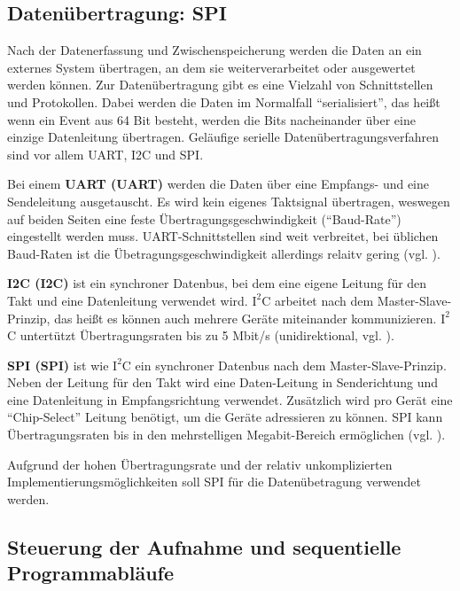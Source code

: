 \subsection{Datenübertragung: SPI}

Nach der Datenerfassung und Zwischenspeicherung werden die Daten an ein externes System übertragen, an dem sie weiterverarbeitet oder ausgewertet werden können. Zur Datenübertragung gibt es eine Vielzahl von Schnittstellen und Protokollen. Dabei werden die Daten im Normalfall ``serialisiert'', das heißt wenn ein Event aus 64 Bit besteht, werden die Bits nacheinander über eine einzige Datenleitung übertragen. Geläufige serielle Datenübertragungsverfahren sind vor allem \acrshort{UART}, \acrshort{I2C} und \acrshort{SPI}.
\begin{description}
	\item Bei einem \textbf{UART (\acrlong{UART})} werden die Daten über eine Empfangs- und eine Sendeleitung ausgetauscht. Es wird kein eigenes Taktsignal übertragen, weswegen auf beiden Seiten eine feste Übertragungsgeschwindigkeit (``Baud-Rate'') eingestellt werden muss. UART-Schnittstellen sind weit verbreitet, bei üblichen Baud-Raten ist die Übetragungsgeschwindigkeit allerdings relaitv gering (vgl. \cite{wiki:UART}).
	\item \textbf{\acrshort{I2C} (\acrlong{I2C})} ist ein synchroner Datenbus, bei dem eine eigene Leitung für den Takt und eine Datenleitung verwendet wird. $\text{I}^2$C arbeitet nach dem Master-Slave-Prinzip, das heißt es können auch mehrere Geräte miteinander kommunizieren. $\text{I}^2$C untertützt Übertragungsraten bis zu 5 Mbit/s (unidirektional, vgl. \cite{wiki:I2C}).
	\item \textbf{\acrshort{SPI} (\acrlong{SPI})} ist wie $\text{I}^2$C ein synchroner Datenbus nach dem Master-Slave-Prinzip. Neben der Leitung für den Takt wird eine Daten-Leitung in Senderichtung und eine Datenleitung in Empfangsrichtung verwendet. Zusätzlich wird pro Gerät eine ``Chip-Select'' Leitung benötigt, um die Geräte adressieren zu können. SPI kann Übertragungsraten bis in den mehrstelligen Megabit-Bereich ermöglichen (vgl. \cite{wiki:SPI}).
\end{description}

Aufgrund der hohen Übertragungsrate und der relativ unkomplizierten Implementierungsmöglichkeiten soll SPI für die Datenübetragung verwendet werden.


\subsection{Steuerung der Aufnahme und sequentielle Programmabläufe}

